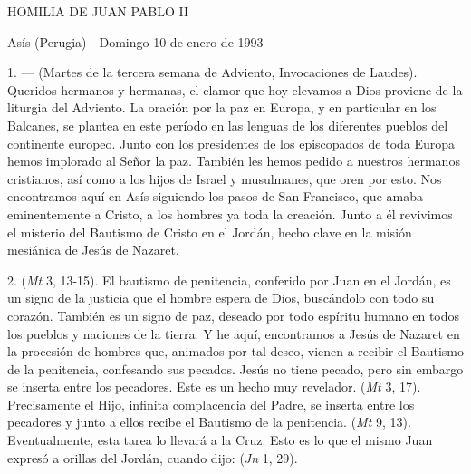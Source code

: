 \begin{body}
	HOMILIA DE JUAN PABLO II

	Asís (Perugia) - Domingo 10 de enero de 1993

	1.  ---  (Martes de la tercera semana de Adviento, Invocaciones de Laudes). Queridos hermanos y hermanas, el clamor que hoy elevamos a Dios proviene de la liturgia del Adviento. La oración por la paz en Europa, y en particular en los Balcanes, se plantea en este período en las lenguas de los diferentes pueblos del continente europeo. Junto con los presidentes de los episcopados de toda Europa hemos implorado al Señor la paz. También les hemos pedido a nuestros hermanos cristianos, así como a los hijos de Israel y musulmanes, que oren por esto. Nos encontramos aquí en Asís siguiendo los pasos de San Francisco, que amaba eminentemente a Cristo, a los hombres ya toda la creación. Junto a él revivimos el misterio del Bautismo de Cristo en el Jordán, hecho clave en la misión mesiánica de Jesús de Nazaret.

	2.  (\emph{Mt} 3, 13-15). El bautismo de penitencia, conferido por Juan en el Jordán, es un signo de la justicia que el hombre espera de Dios, buscándolo con todo su corazón. También es un signo de paz, deseado por todo espíritu humano en todos los pueblos y naciones de la tierra. Y he aquí, encontramos a Jesús de Nazaret en la procesión de hombres que, animados por tal deseo, vienen a recibir el Bautismo de la penitencia, confesando sus pecados. Jesús no tiene pecado, pero sin embargo se inserta entre los pecadores. Este es un hecho muy revelador.  (\emph{Mt} 3, 17). Precisamente el Hijo, infinita complacencia del Padre, se inserta entre los pecadores y junto a ellos recibe el Bautismo de la penitencia.  (\emph{Mt} 9, 13). Eventualmente, esta tarea lo llevará a la Cruz. Esto es lo que el mismo Juan expresó a orillas del Jordán, cuando dijo:  (\emph{Jn} 1, 29).


\end{body}
